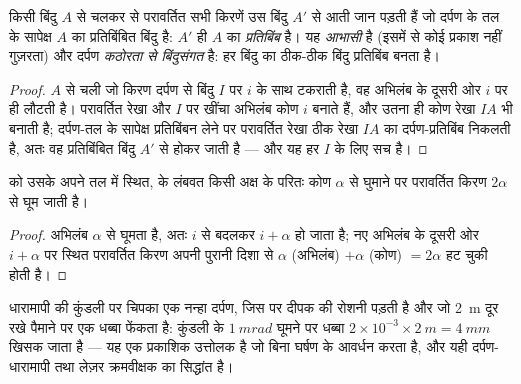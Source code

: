 \begin{proposition}[समतल दर्पण में प्रतिबिंब]\label{prop:b1:rays-reflection-refraction:mirror}
किसी बिंदु $A$ से चलकर  से परावर्तित सभी किरणें उस बिंदु $A'$ से आती
जान पड़ती हैं जो दर्पण के तल के सापेक्ष $A$ का प्रतिबिंबित बिंदु है: $A'$ ही
$A$ का \emph{प्रतिबिंब} है। यह \emph{आभासी} है (इसमें से कोई प्रकाश नहीं
गुज़रता) और दर्पण \emph{कठोरता से बिंदुसंगत} है: हर बिंदु का ठीक-ठीक बिंदु
प्रतिबिंब बनता है।
\end{proposition}

\begin{proof}
$A$ से चली जो किरण दर्पण से बिंदु $I$ पर  $i$ के साथ टकराती है, वह
अभिलंब के दूसरी ओर $i$ पर ही लौटती है। परावर्तित रेखा और $I$ पर खींचा अभिलंब
कोण $i$ बनाते हैं, और उतना ही कोण रेखा $IA$ भी बनाती है; दर्पण-तल के सापेक्ष
प्रतिबिंबन लेने पर परावर्तित रेखा ठीक रेखा $IA$ का दर्पण-प्रतिबिंब निकलती है,
अतः वह प्रतिबिंबित बिंदु $A'$ से होकर जाती है --- और यह हर
$I$ के लिए सच है।
\end{proof}

\begin{proposition}[दर्पण को घुमाना]\label{prop:b1:rays-reflection-refraction:rotation}
 को उसके अपने तल में स्थित,  के लंबवत किसी अक्ष के परितः कोण
$\alpha$ से घुमाने पर परावर्तित किरण $2\alpha$ से घूम जाती
है।
\end{proposition}

\begin{proof}
अभिलंब $\alpha$ से घूमता है, अतः  $i$ से बदलकर
$i + \alpha$ हो जाता है; नए अभिलंब के दूसरी ओर $i + \alpha$ पर स्थित
परावर्तित किरण अपनी पुरानी दिशा से $\alpha$ (अभिलंब) $+ \alpha$ (कोण) $=
2\alpha$ हट चुकी होती है।
\end{proof}

\begin{example}[धारामापी का उत्तोलक]\label{ex:b1:rays-reflection-refraction:galvanometer}
धारामापी की कुंडली पर चिपका एक नन्हा दर्पण, जिस पर दीपक की रोशनी पड़ती है और
जो \qty{2}{m} दूर रखे पैमाने पर एक धब्बा फेंकता है: कुंडली के
$\qty{1}{mrad}$ घूमने पर धब्बा $2 \times 10^{-3} \times
\qty{2}{m} = \qty{4}{mm}$ खिसक जाता है --- यह एक प्रकाशिक उत्तोलक है जो बिना
घर्षण के आवर्धन करता है, और यही दर्पण-धारामापी तथा लेज़र क्रमवीक्षक का
सिद्धांत है।
\end{example}

